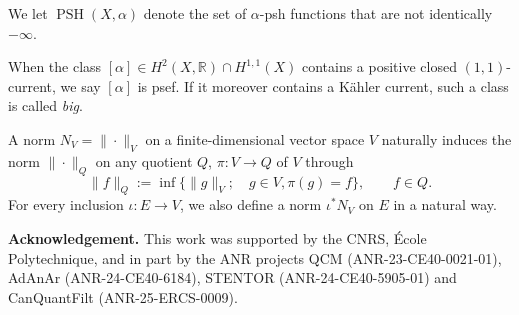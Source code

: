 \documentclass[12pt]{article}
\numberwithin{equation}{section}
\theoremstyle{theorem}
\theoremstyle{definition}
\theoremstyle{remark}
\newcommand{\real}{\mathbb{R}}
\newcommand{\psh}{\operatorname{PSH}}
\begin{document}
	We let $\psh(X, \alpha)$ denote the set of $\alpha$-psh functions that are not identically $-\infty$.
	\par 
	When the class $[\alpha] \in H^2(X, \real) \cap H^{1, 1}(X)$ contains a positive closed $(1, 1)$-current, we say $[\alpha]$ is psef.
	If it moreover contains a Kähler current, such a class is called \textit{big}. 
	\par 
	A norm $N_V = \| \cdot \|_V$ on a finite-dimensional vector space $V$ naturally induces the norm $\| \cdot \|_Q$ on any quotient $Q$, $\pi : V \to Q$ of $V$ through
	\begin{equation}\label{eq_defn_quot_norm}
		\| f \|_Q
		:=
		\inf \big \{
		 \| g \|_V
		 ;
		 \quad
		 g \in V, 
		 \pi(g) = f
		\},
		\qquad f \in Q.
	\end{equation}
	For every inclusion $\iota: E \to V$, we also define a norm $\iota^* N_V$ on $E$ in a natural way.
	\par
	\textbf{Acknowledgement.}
	 This work was supported by the CNRS, École Polytechnique, and in part by the ANR projects QCM (ANR-23-CE40-0021-01), AdAnAr (ANR-24-CE40-6184), STENTOR (ANR-24-CE40-5905-01) and CanQuantFilt (ANR-25-ERCS-0009).
	 
\end{document}
